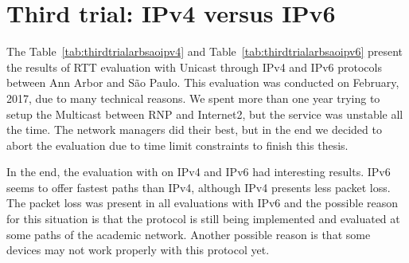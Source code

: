 \section{Third trial: IPv4 versus IPv6}


The Table~\ref{tab:thirdtrialarbsaoipv4} and Table~\ref{tab:thirdtrialarbsaoipv6} present the results of RTT evaluation with Unicast through IPv4 and IPv6 protocols between Ann Arbor and São Paulo.
This evaluation was conducted on February, 2017, due to many technical reasons.
We spent more than one year trying to setup the Multicast between RNP and Internet2, but the service was unstable all the time.
The network managers did their best, but in the end we decided to abort the evaluation due to time limit constraints to finish this thesis.

In the end, the evaluation with on IPv4 and IPv6 had interesting results.
IPv6 seems to offer fastest paths than IPv4, although IPv4 presents less packet loss.
The packet loss was present in all evaluations with IPv6 and the possible reason for this situation is that the protocol is still being implemented and evaluated at some paths of the academic network.
Another possible reason is that some devices may not work properly with this protocol yet.


